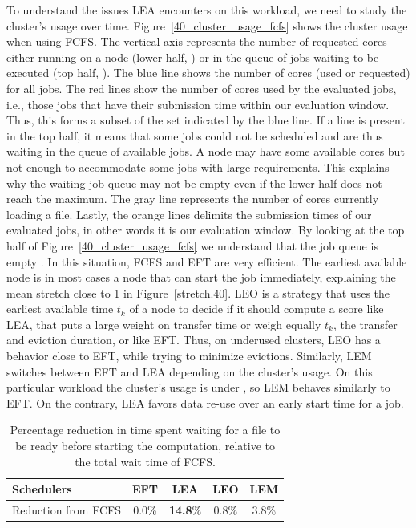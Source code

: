 \documentclass[sigconf,review,anonymous]{acmart}
\newcommand{\rev}[1]{{\color{black}{#1}}}
\begin{document}
To understand the issues LEA encounters on this workload, we need to study the cluster's usage over time.
Figure~\ref{40_cluster_usage_fcfs} shows the cluster usage when using FCFS.
The vertical axis represents the number of requested cores either running on a
node (lower half, \rev{the maximum is the total number of cores on our cluster: 9720}) or in the queue of jobs waiting to be executed (top
half, \rev{where the number of requested cores can be much higher than the cluster's capability}).
The blue line shows the number of cores (used or requested) for all jobs.
The red lines show the number of cores used by the evaluated jobs, i.e.,
those jobs that have their submission time within our evaluation window. Thus, this forms a subset
of the set indicated by the blue line.
If a line is present in the top half, it means that some jobs could not be scheduled
and are thus waiting in the queue of available jobs. 
A node may have some available cores but not enough to accommodate some jobs with large requirements.
This explains why the waiting job queue may not be empty even if the lower half does not reach the maximum.
The gray line represents the number of cores currently loading a file.
Lastly, the orange lines delimits the submission times of our 
evaluated jobs, in other words it is our evaluation window.
By looking at the top half of Figure~\ref{40_cluster_usage_fcfs}
we understand that the job queue is empty \rev{for more than half of the evaluation window}.
In this situation, FCFS and EFT are very efficient. The earliest available node is in
most cases a node that can start the job immediately, explaining the mean stretch close to 1 in Figure~\ref{stretch.40}.
LEO is a strategy that uses the earliest available time $t_k$ of a node to decide if it should compute a score like LEA,
that puts a large weight on transfer time
or weigh equally $t_k$, the transfer and eviction duration, or like EFT. 
Thus, on underused clusters, LEO has a behavior close to EFT, while trying to minimize evictions.
Similarly, LEM switches between EFT and LEA depending on the cluster's usage.
On this particular workload the cluster's usage is under \rev{100\% more than half the time}, so LEM behaves similarly to EFT.
On the contrary, LEA favors data re-use over an early start time for a job.

\begin{table}
\begin{tabular}{ l c c c c }
  \toprule
  Schedulers & EFT & \textbf{LEA} & LEO & LEM \\
  \midrule
  Reduction from FCFS & 0.0\% & \textbf{14.8}\% & 0.8\% & 3.8\% \\ %
  \bottomrule
\end{tabular}
\caption{Percentage reduction in time spent waiting for a file to be ready before starting the computation, relative to the total wait time of FCFS.}\label{tab.40}
\end{table}
\end{document}
